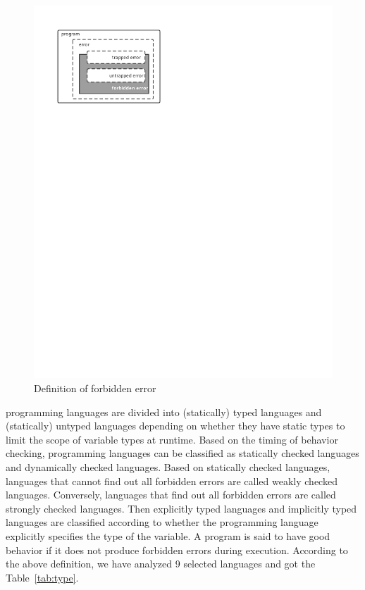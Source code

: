 \begin{figure}[htbp]
    \centerline{\includegraphics[scale=0.8]{figures/type-definition}}
    \caption{Definition of forbidden error}
    \label{fig:type-definition}
\end{figure}


programming languages are divided into (statically) typed languages and (statically) untyped languages
depending on whether they have static types to limit the scope of variable types at runtime.
Based on the timing of behavior checking, programming languages
can be classified as statically checked languages and dynamically checked languages.
Based on statically checked languages, languages that cannot find out all forbidden
errors are called weakly checked languages.
Conversely, languages that find out all forbidden errors are called strongly checked languages.
Then explicitly typed languages and implicitly typed languages are
classified according to whether the programming language explicitly
specifies the type of the variable.
A program is said to have good behavior if it does not produce
forbidden errors during execution.
According to the above definition,
we have analyzed 9 selected languages and got the Table~\ref{tab:type}.

